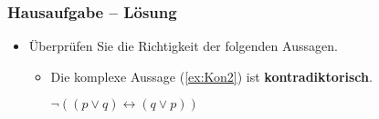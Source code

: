 \begin{frame}
\frametitle{Hausaufgabe -- Lösung}

\begin{itemize}
\item Überprüfen Sie die Richtigkeit der folgenden Aussagen.

\vspace{1em}

\begin{itemize}	
	\item Die komplexe Aussage (\ref{ex:Kon2}) ist \textbf{kontradiktorisch}.
	
	\begin{exe}
		 $\lnot ((p \lor q) \leftrightarrow (q \lor p))$
	\end{exe}		
\end{itemize}	

\end{itemize}

\begin{table}
\centering	
{}
\end{table} 


\end{frame}

